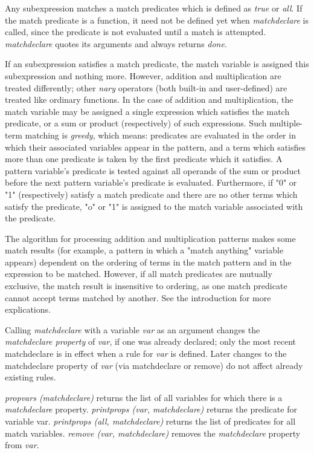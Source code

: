 \documentclass[../Maxima_Workbook.tex]{subfiles}
\begin{document}
\lz Any subexpression matches a match predicates which is defined as \emph{true} or \emph{all}. If the match predicate is a function, it need not be defined yet when \emph{matchdeclare} is called, since the predicate is not evaluated until a match is attempted. \emph{matchdeclare} quotes its arguments and always returns \emph{done}.

\lz If an subexpression satisfies a match predicate, the match variable is assigned this subexpression and nothing more. However, addition and multiplication are treated differently; other \emph{nary} operators (both built-in and user-defined) are treated like ordinary functions. In the case of addition and multiplication, the match variable may be assigned a single expression which satisfies the match predicate, or a sum or product (respectively) of such expressions. Such multiple-term matching is \emph{greedy}, which means: predicates are evaluated in the order in which their associated variables appear in the pattern, and a term which satisfies more than one predicate is taken by the first predicate which it satisfies. A pattern variable's predicate is tested against all operands of the sum or product before the next pattern variable's predicate is evaluated. Furthermore, if "0" or "1" (respectively) satisfy a match predicate and there are no other terms which satisfy the predicate, "o" or "1" is assigned to the match variable associated with the predicate. 

\lz The algorithm for processing addition and multiplication patterns makes some match results (for example, a pattern in which a "match anything" variable appears) dependent on the ordering of terms in the match pattern and in the expression to be matched. However, if all match predicates are mutually exclusive, the match result is insensitive to ordering, as one match predicate cannot accept terms matched by another. See the introduction for more explications.

\lz Calling \emph{matchdeclare} with a variable \emph{var} as an argument changes the \emph{matchdeclare property} of \emph{var}, if one was already declared; only the most recent matchdeclare is in effect when a rule for \emph{var} is defined. Later changes to the matchdeclare property of \emph{var} (via matchdeclare or remove) do not affect already existing rules.

\lz \emph{propvars (matchdeclare)} returns the list of all variables for which there is a \emph{matchdeclare} property. \emph{printprops (var, matchdeclare)} returns the predicate for variable var. \emph{printprops (all, matchdeclare)} returns the list of predicates for all match variables. \emph{remove (var, matchdeclare)} removes the \emph{matchdeclare} property from \emph{var}.
\end{document}
